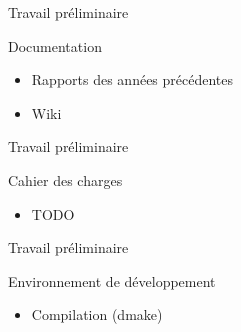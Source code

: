 \documentclass{beamer}
\begin{document}
\begin{frame}{Travail préliminaire}
    \begin{block}{Documentation}
        \begin{itemize}[<+->]
            \item Rapports des années précédentes
            \item Wiki
        \end{itemize}
    \end{block}
\end{frame}

\begin{frame}{Travail préliminaire}
    \begin{block}{Cahier des charges}
        \begin{itemize}[<+->]
            \item TODO 
        \end{itemize}
    \end{block}
\end{frame}

\begin{frame}{Travail préliminaire}
    \begin{block}{Environnement de développement}
        \begin{itemize}[<+->]
            \item Compilation (dmake)
        \end{itemize}
    \end{block}
\end{frame}
\end{document}
